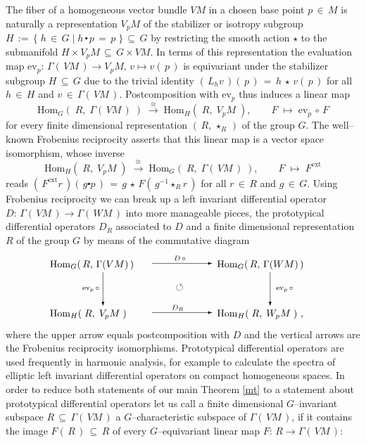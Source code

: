 \documentclass[12pt]{article}
\def\ev{\mathrm{ev}}
\def\ext{\mathrm{ext}}
\def\Hom{\mathrm{Hom}}
\begin{document}
 The fiber of a homogeneous vector bundle $VM$ in a chosen base point
 $p\,\in\,M$ is naturally a representation $V_pM$ of the stabilizer or
 isotropy subgroup $H\,:=\,\{\;h\,\in\,G\;|\;h\,\centerdot\,p\,=\,p\;\}
 \,\subseteq\,G$ by restricting the smooth action $\star$ to the
 submanifold $H\times V_pM\,\subseteq\,G\times VM$. In terms of this
 representation the evaluation map $\ev_p:\,\Gamma(\,VM\,)\longrightarrow
 V_pM,\,v\longmapsto v(\,p\,)$ is equivariant under the stabilizer subgroup
 $H\,\subseteq\,G$ due to the trivial identity $(\,L_hv\,)(\,p\,)\,=\,
 h\,\star\,v(\,p\,)$ for all $h\,\in\,H$ and $v\,\in\,\Gamma(\,VM\,)$.
 Postcomposition with $\ev_p$ thus induces a linear map
 \begin{equation}\label{frob}
  \Hom_G(\;R,\;\Gamma(\,VM\,)\;)\;\stackrel\cong\longrightarrow\;
  \Hom_H(\;R,\;V_pM\;),\qquad F\;\longmapsto\;\ev_p\,\circ\,F
 \end{equation}
 for every finite dimensional representation $(\,R,\,\star_R\,)$ of the group
 $G$. The well--known Frobenius reciprocity asserts that this linear map is
 a vector space isomorphism, whose inverse
 \begin{equation}\label{invfrob}
  \Hom_H(\;R,\;V_pM\;)\;\stackrel\cong\longrightarrow\;
  \Hom_G(\;R,\;\Gamma(\,VM\,)\;),\qquad F\;\longmapsto\;F^\ext
 \end{equation}
 reads $(\,F^\ext r\,)(\,g\centerdot p\,)\,=\,g\,\star\,F(\,g^{-1}\star_Rr\,)$
 for all $r\,\in\,R$ and $g\,\in\,G$. Using Frobenius reciprocity we can break
 up a left invariant differential operator $D:\,\Gamma(\,VM\,)\longrightarrow
 \Gamma(\,WM\,)$ into more manageable pieces, the prototypical differential
 operators $D_R$ associated to $D$ and a finite dimensional representation
 $R$ of the group $G$ by means of the commutative diagram
 \begin{equation}\label{cd}
  \begin{picture}(270,65)(0,0)
   \put(  0, 0){$\Hom_H(\;R,\;V_pM\;)$}
   \put(  0,50){$\Hom_G(\,R,\,\Gamma(VM)\,)$}
   \put(170, 0){$\Hom_H(\;R,\;W_pM\;)$\ ,}
   \put(170,50){$\Hom_G(\,R,\,\Gamma(WM)\,)$}
   \put(104, 4){\vector(+1, 0){61}}
   \put(124, 7){$\scriptstyle D_R$}
   \put(104,54){\vector(+1, 0){61}}
   \put(126,57){$\scriptstyle D\,\circ$}
   \put( 54,45){\vector( 0,-1){34}}
   \put( 33,27){$\scriptstyle\ev_p\,\circ$}
   \put(224,45){\vector( 0,-1){34}}
   \put(230,27){$\scriptstyle\ev_p\,\circ$}
   \put(128,27){$\circlearrowleft$}
  \end{picture}
 \end{equation}
 where the upper arrow equals postcomposition with $D$ and the vertical
 arrows are the Frobenius reciprocity isomorphisms. Prototypical differential
 operators are used frequently in harmonic analysis, for example to calculate
 the spectra of elliptic left invariant differential operators on compact
 homogeneous spaces. In order to reduce both statements of our main Theorem
 \ref{mt} to a statement about prototypical differential operators let us call
 a finite dimensional $G$--invariant subspace $R\,\subseteq\,\Gamma(\,VM\,)$
 a $G$--characteristic subspace of $\Gamma(\,VM\,)$, if it contains the image
 $F(\,R\,)\,\subseteq\,R$ of every $G$--equivariant linear map
 $F:\,R\longrightarrow\Gamma(\,VM\,)$:
\end{document}
